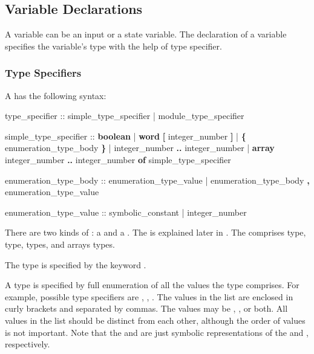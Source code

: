 \subsection{Variable Declarations}
\label{Variable Declarations}

A variable can be an input or a state variable. 
%
The declaration of a variable specifies the variable's type with the
help of type specifier.

\subsubsection{Type Specifiers}
\label{Type Specifiers}
%
A  has the following syntax:
%
\begin{Grammar}
type_specifier ::
        simple_type_specifier
      | module_type_specifier

simple_type_specifier :: 
        \textbf{boolean}
      | \textbf{word} \textbf{[} integer_number \textbf{]} 
      | \textbf{\{} enumeration_type_body \textbf{\}}
      | integer_number \textbf{..} integer_number
      | \textbf{array} integer_number \textbf{..} integer_number
        \textbf{of} simple_type_specifier

enumeration_type_body ::
        enumeration_type_value
      | enumeration_type_body \textbf{,} enumeration_type_value

enumeration_type_value ::
        symbolic_constant
      | integer_number
\end{Grammar}
% 
There are two kinds of : a  and a . 
%
The  is explained later in
.
%
The  comprises \Boolean type, \Integer
type, \Enum types, \Word[] and arrays 
types.

The \Boolean type is specified by the keyword . 

A \Enum type is specified by full enumeration of all the values the
type comprises. 
%
For example, possible \Enum type specifiers are ,
, .
%
The values in the list are enclosed in curly brackets and separated by
commas. 
%
The values may be , , or both.
%
All values in the list should be distinct from each other, although the
order of values is not important. 
%
Note that the   and
 are just symbolic representations of the
  and , respectively.

